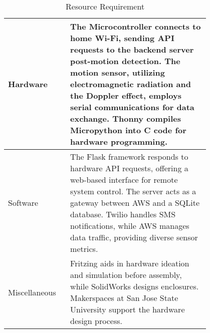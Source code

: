 \begin{table}[htbp]
    \begin{center}
        
        \begin{tabular}{|p{0.2\linewidth}|p{0.6\linewidth}|}
            \hline
            Hardware      & The Microcontroller connects to home Wi-Fi, sending API requests to the backend server post-motion detection. The motion sensor, utilizing electromagnetic radiation and the Doppler effect, employs serial communications for data exchange. Thonny compiles Micropython into C code for hardware programming.
            \\
            \hline
            Software      & The Flask framework responds to hardware API requests, offering a web-based interface for remote system control. The server acts as a gateway between AWS and a SQLite database. Twilio handles SMS notifications, while AWS manages data traffic, providing diverse sensor metrics.
            \\
            \hline
            Miscellaneous & Fritzing aids in hardware ideation and simulation before assembly, while SolidWorks designs enclosures. Makerspaces at San Jose State University support the hardware design process.                                                                                                                           \\
            \hline
        \end{tabular}
    \end{center}
    \caption{Resource Requirement}
    \label{tab:tab1}
\end{table}


